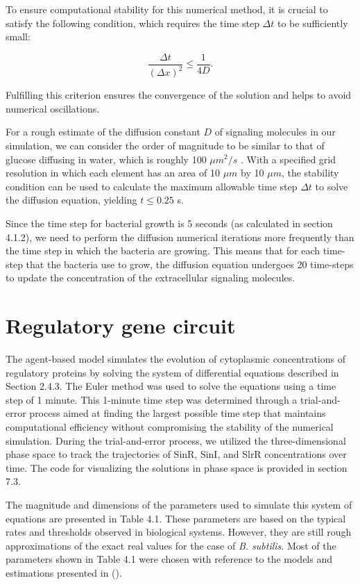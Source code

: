 To ensure computational stability for this numerical method, it is crucial to satisfy the following condition, which requires the time step \(\Delta t\) to be sufficiently small:

\[\frac{{\Delta t}}{{(\Delta x)^2}} \leq \frac{1}{{4D}}.\]

Fulfilling this criterion ensures the convergence of the solution and helps to avoid numerical oscillations. {\footnotesize\cite{gitconnectedSolvingHeat}\cite{unimuenster}}

For a rough estimate of the diffusion constant \(D\) of signaling molecules in our simulation, we can consider the order of magnitude to be similar to that of glucose diffusing in water, which is roughly 100 \(\mu m^2/s\) {\footnotesize\cite{Bashkatov2003}}. With a specified grid resolution in which each element has an area of 10 \(\mu m\) by 10 \(\mu m\), the stability condition can be used to calculate the maximum allowable time step \(\Delta t\) to solve the diffusion equation, yielding \(t \leq 0.25\) s.

Since the time step for bacterial growth is 5 seconds (as calculated in section 4.1.2), we need to perform the diffusion numerical iterations more frequently than the time step in which the bacteria are growing. This means that for each time-step that the bacteria use to grow, the diffusion equation undergoes 20 time-steps to update the concentration of the extracellular signaling molecules.


\section{Regulatory gene circuit}\label{sec:contrib2:theme2}


The agent-based model simulates the evolution of cytoplasmic concentrations of regulatory proteins by solving the system of differential equations described in Section 2.4.3. The Euler method was used to solve the equations using a time step of 1 minute. This 1-minute time step was determined through a trial-and-error process aimed at finding the largest possible time step that maintains computational efficiency without compromising the stability of the numerical simulation. During the trial-and-error process, we utilized the three-dimensional phase space to track the trajectories of SinR, SinI, and SlrR concentrations over time. The code for visualizing the solutions in phase space is provided in section 7.3.

The magnitude and dimensions of the parameters used to simulate this system of equations are presented in Table 4.1. These parameters are based on the typical rates and thresholds observed in biological systems. However, they are still rough approximations of the exact real values for the case of \textit{B. subtilis}. Most of the parameters shown in Table 4.1 were chosen with reference to the models and estimations presented in ({\footnotesize\cite{simon}\cite{Voigt2005}\cite{Newman2013}\cite{Chen2023}\cite{Pedreira2021}\cite{Hallinan2010}}).

